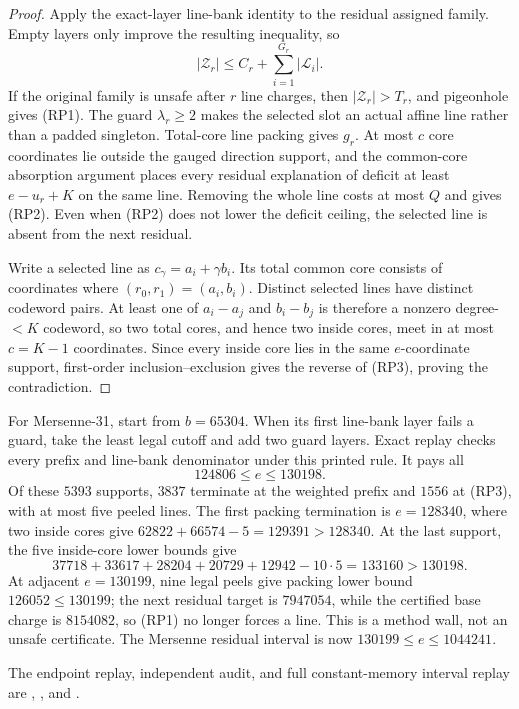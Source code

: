 \documentclass[11pt,a4paper]{amsart}
\numberwithin{equation}{section}
\theoremstyle{remark}
\begin{document}
\begin{proof}
Apply the exact-layer line-bank identity to the residual assigned family.
Empty layers only improve the resulting inequality, so
\[
 |\mathcal Z_r|\le C_r+\sum_{i=1}^{G_r}|\mathcal L_i|.
\]
If the original family is unsafe after \(r\) line charges, then
\(|\mathcal Z_r|>T_r\), and pigeonhole gives (RP1).  The guard
\(\lambda_r\ge2\) makes the selected slot an actual affine line rather than
a padded singleton.  Total-core line packing gives \(g_r\).  At most \(c\)
core coordinates lie outside the gauged direction support, and the
common-core absorption argument places every residual explanation of
deficit at least \(e-u_r+K\) on the same line.  Removing the whole line costs
at most \(Q\) and gives (RP2).  Even when (RP2) does not lower the deficit
ceiling, the selected line is absent from the next residual.

Write a selected line as \(c_\gamma=a_i+\gamma b_i\).  Its total common
core consists of coordinates where
\((r_0,r_1)=(a_i,b_i)\).  Distinct selected lines have distinct codeword
pairs.  At least one of \(a_i-a_j\) and \(b_i-b_j\) is therefore a nonzero
degree-\(<K\) codeword, so two total cores, and hence two inside cores, meet
in at most \(c=K-1\) coordinates.  Since every inside core lies in the same
\(e\)-coordinate support, first-order inclusion--exclusion gives the reverse
of (RP3), proving the contradiction.
\end{proof}

\begin{remark}
For Mersenne-31, start from \(b=65304\).  When its first line-bank layer
fails a guard, take the least legal cutoff and add two guard layers.  Exact
replay checks every prefix and line-bank denominator under this printed
rule.  It pays all
\[
 124806\le e\le130198.
\]
Of these \(5393\) supports, \(3837\) terminate at the weighted prefix and
\(1556\) at (RP3), with at most five peeled lines.  The first packing
termination is \(e=128340\), where two inside cores give
\(62822+66574-5=129391>128340\).  At the last support, the five inside-core
lower bounds give
\[
 37718+33617+28204+20729+12942-10\cdot5
 =133160>130198.
\]
At adjacent \(e=130199\), nine legal peels give packing lower bound
\(126052\le130199\); the next residual target is \(7947054\), while the
certified base charge is \(8154082\), so (RP1) no longer forces a line.  This
is a method wall, not an unsafe certificate.  The Mersenne residual interval
is now \(130199\le e\le1044241\).

The endpoint replay, independent audit, and full constant-memory interval
replay are
,
,
and
.
\end{remark}
\end{document}

